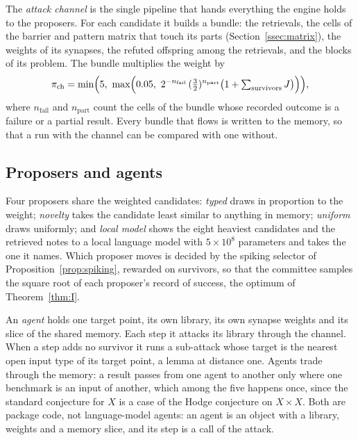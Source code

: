 The \emph{attack channel} is the single pipeline that hands everything the engine holds to the proposers. For each candidate it builds a bundle: the retrievals, the cells of the barrier and pattern matrix that touch its parts (Section~\ref{ssec:matrix}), the weights of its synapses, the refuted offspring among the retrievals, and the blocks of its problem. The bundle multiplies the weight by
\begin{equation}\label{eq:channelprior}
\pi_{\mathrm{ch}}=\min\Bigl(5,\ \max\Bigl(0.05,\ 2^{-n_{\mathrm{fail}}}\,(\tfrac32)^{n_{\mathrm{part}}}\bigl(1+\textstyle\sum_{\text{survivors}}J\bigr)\Bigr)\Bigr),
\end{equation}
where $n_{\mathrm{fail}}$ and $n_{\mathrm{part}}$ count the cells of the bundle whose recorded outcome is a failure or a partial result. Every bundle that flows is written to the memory, so that a run with the channel can be compared with one without.

\subsection{Proposers and agents}

Four proposers share the weighted candidates: \emph{typed} draws in proportion to the weight; \emph{novelty} takes the candidate least similar to anything in memory; \emph{uniform} draws uniformly; and \emph{local model} shows the eight heaviest candidates and the retrieved notes to a local language model with $5\times10^{8}$ parameters \cite{Qwe24} and takes the one it names. Which proposer moves is decided by the spiking selector of Proposition~\ref{prop:spiking}, rewarded on survivors, so that the committee samples the square root of each proposer's record of success, the optimum of Theorem~\ref{thm:I}.

An \emph{agent} holds one target point, its own library, its own synapse weights and its slice of the shared memory. Each step it attacks its library through the channel. When a step adds no survivor it runs a sub-attack whose target is the nearest open input type of its target point, a lemma at distance one. Agents trade through the memory: a result passes from one agent to another only where one benchmark is an input of another, which among the five happens once, since the standard conjecture for $X$ is a case of the Hodge conjecture on $X\times X$. Both are package code, not language-model agents: an agent is an object with a library, weights and a memory slice, and its step is a call of the attack.


